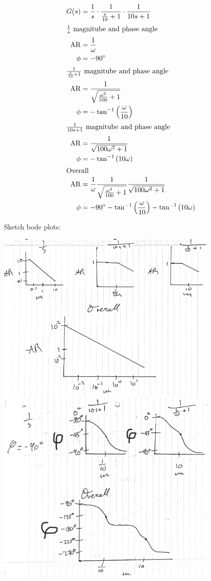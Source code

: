 \documentclass[12pt]{article}
\begin{document}
\begin{enumerate}
    \begin{align*}
        G(s) &= \frac{1}{s} \cdot \frac{1}{\frac{s}{10} + 1} \cdot \frac{1}{10s + 1} \\
        \intertext{$\frac{1}{s}$ magnitube and phase angle}
        \text{AR} &= \frac{1}{\omega} \\
        \phi &= -90^\circ \\
        \intertext{$\frac{1}{\frac{s}{10} + 1}$ magnitube and phase angle}
        \text{AR} &= \frac{1}{\sqrt{\frac{\omega^2}{100}+1}} \\
        \phi &= -\tan^{-1}\left(\frac{\omega}{10}\right) \\
        \intertext{$\frac{1}{10s + 1}$ magnitube and phase angle}
        \text{AR} &= \frac{1}{\sqrt{100\omega^2+1}} \\
        \phi &= -\tan^{-1}\left(10\omega\right) \\
        \intertext{Overall}
        \text{AR} &= \frac{1}{\omega} \frac{1}{\sqrt{\frac{\omega^2}{100}+1}} \frac{1}{\sqrt{100\omega^2+1}} \\
        \phi &= -90^\circ - \tan^{-1}\left(\frac{\omega}{10}\right) - \tan^{-1}\left(10\omega\right) \\
    \end{align*}

    Sketch bode plots:

    \begin{center}
        \includegraphics[width=0.8\textwidth]{assets/i_mag.jpg}
        \includegraphics[width=0.8\textwidth]{assets/i_phase.jpg}
    \end{center}


\end{enumerate}
\end{document}

